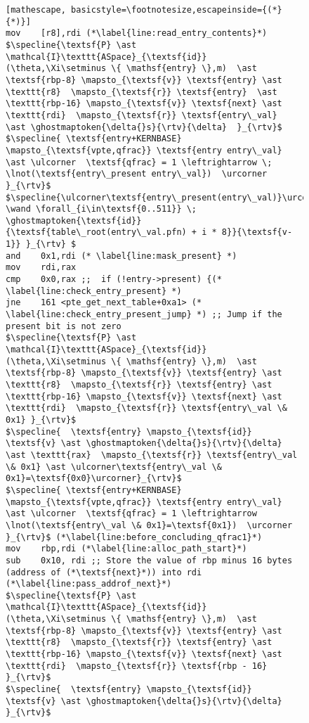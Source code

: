 \begin{figure}
\begin{lstlisting}[mathescape, basicstyle=\footnotesize,escapeinside={(*}{*)}]
mov    [r8],rdi (*\label{line:read_entry_contents}*)
$\specline{\textsf{P} \ast \mathcal{I}\texttt{ASpace}_{\textsf{id}}(\theta,\Xi\setminus \{ \mathsf{entry} \},m)  \ast \textsf{rbp-8} \mapsto_{\textsf{v}} \textsf{entry} \ast \texttt{r8}  \mapsto_{\textsf{r}} \textsf{entry}  \ast  \texttt{rbp-16} \mapsto_{\textsf{v}} \textsf{next} \ast \texttt{rdi}  \mapsto_{\textsf{r}} \textsf{entry\_val}  \ast \ghostmaptoken{\delta{}s}{\rtv}{\delta}  }_{\rtv}$
$\specline{ \textsf{entry+KERNBASE} \mapsto_{\textsf{vpte,qfrac}} \textsf{entry entry\_val} \ast \ulcorner  \textsf{qfrac} = 1 \leftrightarrow \; \lnot(\textsf{entry\_present entry\_val})  \urcorner }_{\rtv}$
$\specline{\ulcorner\textsf{entry\_present(entry\_val)}\urcorner \wand \forall_{i\in\textsf{0..511}} \; \ghostmaptoken{\textsf{id}}{\textsf{table\_root(entry\_val.pfn) + i * 8}}{\textsf{v-1}} }_{\rtv} $
and    0x1,rdi (* \label{line:mask_present} *)
mov    rdi,rax
cmp    0x0,rax ;;  if (!entry->present) {(* \label{line:check_entry_present} *)
jne    161 <pte_get_next_table+0xa1> (* \label{line:check_entry_present_jump} *) ;; Jump if the present bit is not zero
$\specline{\textsf{P} \ast \mathcal{I}\texttt{ASpace}_{\textsf{id}}(\theta,\Xi\setminus \{ \mathsf{entry} \},m)  \ast \textsf{rbp-8} \mapsto_{\textsf{v}} \textsf{entry} \ast \texttt{r8}  \mapsto_{\textsf{r}} \textsf{entry} \ast \texttt{rbp-16} \mapsto_{\textsf{v}} \textsf{next} \ast \texttt{rdi}  \mapsto_{\textsf{r}} \textsf{entry\_val \& 0x1} }_{\rtv}$
$\specline{  \textsf{entry} \mapsto_{\textsf{id}} \textsf{v} \ast \ghostmaptoken{\delta{}s}{\rtv}{\delta}  \ast \texttt{rax}  \mapsto_{\textsf{r}} \textsf{entry\_val \& 0x1} \ast \ulcorner\textsf{entry\_val \& 0x1}=\textsf{0x0}\urcorner}_{\rtv}$
$\specline{ \textsf{entry+KERNBASE} \mapsto_{\textsf{vpte,qfrac}} \textsf{entry entry\_val} \ast \ulcorner  \textsf{qfrac} = 1 \leftrightarrow  \lnot(\textsf{entry\_val \& 0x1}=\textsf{0x1})  \urcorner }_{\rtv}$ (*\label{line:before_concluding_qfrac1}*)
mov    rbp,rdi (*\label{line:alloc_path_start}*)
sub    0x10, rdi ;; Store the value of rbp minus 16 bytes (address of (*\textsf{next}*)) into rdi (*\label{line:pass_addrof_next}*)
$\specline{\textsf{P} \ast \mathcal{I}\texttt{ASpace}_{\textsf{id}}(\theta,\Xi\setminus \{ \mathsf{entry} \},m)  \ast \textsf{rbp-8} \mapsto_{\textsf{v}} \textsf{entry} \ast \texttt{r8}  \mapsto_{\textsf{r}} \textsf{entry} \ast \texttt{rbp-16} \mapsto_{\textsf{v}} \textsf{next} \ast \texttt{rdi}  \mapsto_{\textsf{r}} \textsf{rbp - 16} }_{\rtv}$
$\specline{  \textsf{entry} \mapsto_{\textsf{id}} \textsf{v} \ast \ghostmaptoken{\delta{}s}{\rtv}{\delta} }_{\rtv}$

\end{lstlisting}
\end{figure}
